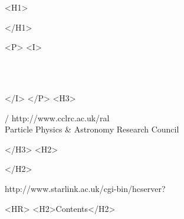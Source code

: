 \begin{htmlonly}
   \xlabel{}
   \begin{rawhtml} <H1> \end{rawhtml}
      \stardoctitle
   \begin{rawhtml} </H1> \end{rawhtml}


   \begin{rawhtml} <P> <I> \end{rawhtml}
   \stardoccategory \stardocnumber \\
   \stardocauthors \\
   \stardocdate
   \begin{rawhtml} </I> </P> <H3> \end{rawhtml}
       /
                        {http://www.cclrc.ac.uk/ral} \\
      Particle Physics \& Astronomy Research Council \\
   \begin{rawhtml} </H3> <H2> \end{rawhtml}
   \begin{rawhtml} </H2> \end{rawhtml}
      {http://www.starlink.ac.uk/cgi-bin/hcserver?\stardocsource}\\

  \label{stardoccontents}
  \begin{rawhtml}
    <HR>
    <H2>Contents</H2>
  \end{rawhtml}
  \renewcommand{\latexonlytoc}[0]{}


\end{htmlonly}


